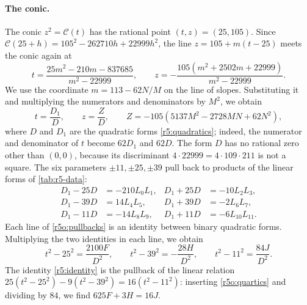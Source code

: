 \documentclass[12pt,oneside,openany]{book}
\theoremstyle{definition}
\theoremstyle{plain}
\numberwithin{equation}{chapter}
\theoremstyle{plain}
\theoremstyle{definition}
\theoremstyle{remark}
\begin{document}
\paragraph{The conic.} The conic $z^2=\mathcal C(t)$ has the rational point $(t,z)=(25,105)$. Since $\mathcal C(25+h)=105^2-262710h+22999h^2$, the line $z=105+m(t-25)$ meets the conic again at
\[
t=\frac{25m^2-210m-837685}{m^2-22999},\qquad z=-\frac{105(m^2+2502m+22999)}{m^2-22999}.
\]
We use the coordinate $m=113-62N/M$ on the line of slopes. Substituting it and multiplying the numerators and denominators by $M^2$, we obtain
\begin{equation}\label{r5o:param}
t=\frac{D_1}D,\qquad z=\frac ZD,\qquad Z=-105(5137M^2-2728MN+62N^2),
\end{equation}
where $D$ and $D_1$ are the quadratic forms \eqref{r5:quadratics}; indeed, the numerator and denominator of $t$ become $62D_1$ and $62D$. The form $D$ has no rational zero other than $(0,0)$, because its discriminant $4\cdot22999=4\cdot109\cdot211$ is not a square. The six parameters $\pm11,\pm25,\pm39$ pull back to products of the linear forms of \cref{tab:r5-data}:
\begin{equation}\label{r5o:pullbacks}
\begin{aligned}
D_1-25D&=-210L_0L_1, & D_1+25D&=-10L_2L_3,\\
D_1-39D&=14L_4L_5, & D_1+39D&=-2L_6L_7,\\
D_1-11D&=-14L_8L_9, & D_1+11D&=-6L_{10}L_{11}.
\end{aligned}
\end{equation}
Each line of \eqref{r5o:pullbacks} is an identity between binary quadratic forms. Multiplying the two identities in each line, we obtain
\begin{equation}\label{r5o:quartics}
t^2-25^2=\frac{2100F}{D^2},\qquad t^2-39^2=-\frac{28H}{D^2},\qquad t^2-11^2=\frac{84J}{D^2}.
\end{equation}
The identity \eqref{r5:identity} is the pullback of the linear relation $25(t^2-25^2)-9(t^2-39^2)=16(t^2-11^2)$: inserting \eqref{r5o:quartics} and dividing by $84$, we find $625F+3H=16J$.
\end{document}
